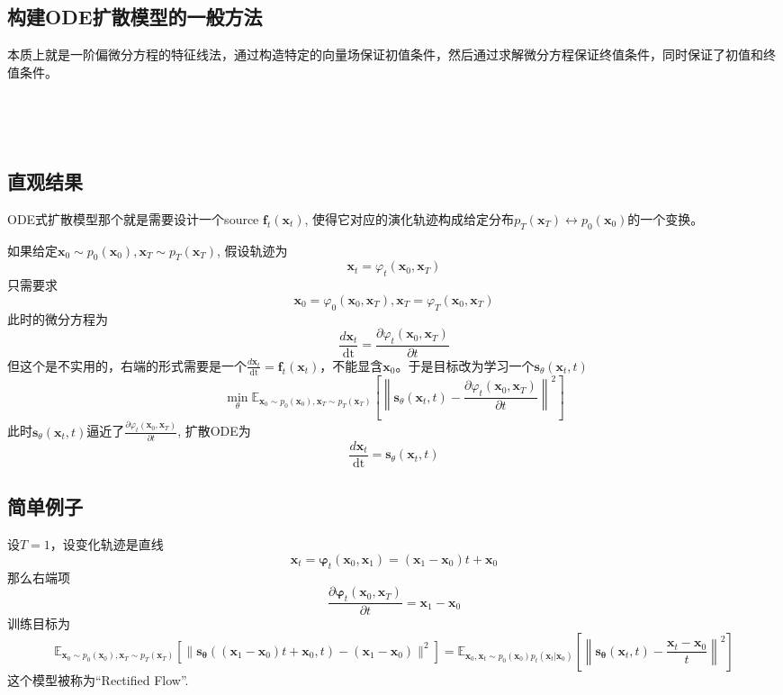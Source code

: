 \documentclass{article}
\newcommand{\tmmathbf}[1]{\ensuremath{\boldsymbol{#1}}}
\newcommand{\tmop}[1]{\ensuremath{\operatorname{#1}}}
\begin{document}
\begin{CJK*}{UTF8}{gbsn}
\section{构建ODE扩散模型的一般方法}

本质上就是一阶偏微分方程的特征线法，通过构造特定的向量场保证初值条件，然后通过求解微分方程保证终值条件，同时保证了初值和终值条件。

\

\

\subsection{直观结果}

ODE式扩散模型那个就是需要设计一个source $\tmmathbf{f}_t
(\tmmathbf{x}_t)$, 使得它对应的演化轨迹构成给定分布$p_T
(\tmmathbf{x}_T) \leftrightarrow p_0 (\tmmathbf{x}_0)$的一个变换。

如果给定$\tmmathbf{x}_0 \sim p_0 (\tmmathbf{x}_0), \tmmathbf{x}_T \sim p_T
(\tmmathbf{x}_T)$, 假设轨迹为
\[ \tmmathbf{x}_t = \varphi_t (\tmmathbf{x}_0, \tmmathbf{x}_T) \label{eq1} \]
只需要求
\[ \tmmathbf{x}_0 = \varphi_0 (\tmmathbf{x}_0, \tmmathbf{x}_T), \tmmathbf{x}_T
   = \varphi_T (\tmmathbf{x}_0, \tmmathbf{x}_T) \]
此时的微分方程为
\[ \frac{d\tmmathbf{x}_t}{\tmop{dt}} = \frac{\partial \varphi_t
   (\tmmathbf{x}_0, \tmmathbf{x}_T)}{\partial t} \]
但这个是不实用的，右端的形式需要是一个$\frac{d\tmmathbf{x}_t}{\tmop{dt}}
=\tmmathbf{f}_t
(\tmmathbf{x}_t)$，不能显含$\tmmathbf{x}_0$。于是目标改为学习一个$\tmmathbf{s}_{\theta}
\left( \tmmathbf{x}_t, \text{} t \right)$
\[ \min_{\theta} \mathbb{E}_{\tmmathbf{x}_0 \sim p_0 (\tmmathbf{x}_0),
   \tmmathbf{x}_T \sim p_T (\tmmathbf{x}_T)} \left[ \left\|
   \tmmathbf{s}_{\theta} (\tmmathbf{x}_t, t) - \frac{\partial \varphi_t
   (\tmmathbf{x}_0, \tmmathbf{x}_T)}{\partial t} \right\|^2 \right] \]
此时$\tmmathbf{s}_{\theta} (\tmmathbf{x}_t, t)$逼近了$\frac{\partial
\varphi_t (\tmmathbf{x}_0, \tmmathbf{x}_T)}{\partial t}$, 扩散ODE为
\[ \frac{d\tmmathbf{x}_t}{\tmop{dt}} =\tmmathbf{s}_{\theta} (\tmmathbf{x}_t,
   t) \]

\subsection{简单例子}

设$T = 1$，设变化轨迹是直线
\[ \tmmathbf{x}_t =\tmmathbf{\varphi}_t (\tmmathbf{x}_0, \tmmathbf{x}_1) =
   (\tmmathbf{x}_1 -\tmmathbf{x}_0) t +\tmmathbf{x}_0 \]
那么右端项
\[ \frac{\partial \tmmathbf{\varphi}_t (\tmmathbf{x}_0,
   \tmmathbf{x}_T)}{\partial t} =\tmmathbf{x}_1 -\tmmathbf{x}_0 \]
训练目标为
\[ \mathbb{E}_{\tmmathbf{x}_0 \sim p_0 (\tmmathbf{x}_0), \tmmathbf{x}_T \sim
   p_T (\tmmathbf{x}_T)} [\| \tmmathbf{s}_{\tmmathbf{\theta}} ((\tmmathbf{x}_1
   -\tmmathbf{x}_0) t +\tmmathbf{x}_0, t) - (\tmmathbf{x}_1 -\tmmathbf{x}_0)
   \|^2] =\mathbb{E}_{\tmmathbf{x}_0, \tmmathbf{x}_t \sim p_0 (\tmmathbf{x}_0)
   p_t (\tmmathbf{x}_t |\tmmathbf{x}_0)} \left[ \left\|
   \tmmathbf{s}_{\tmmathbf{\theta}} (\tmmathbf{x}_t, t) - \frac{\tmmathbf{x}_t
   -\tmmathbf{x}_0}{t} \right\|^2 \right] \]
这个模型被称为“Rectified Flow”.


\end{CJK*}
\end{document}
